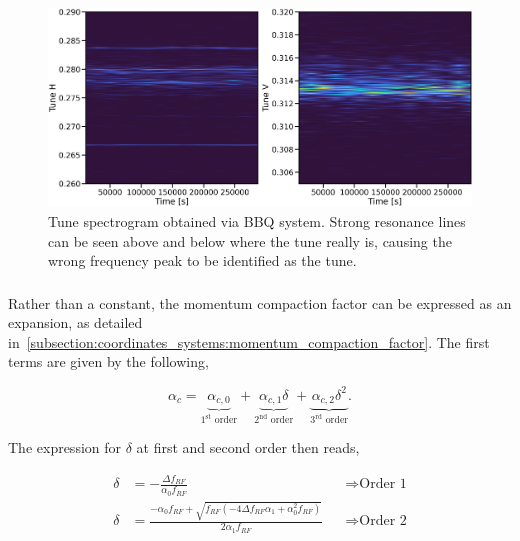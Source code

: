 \begin{figure}[H]
    \centering
    \includegraphics[width=.8\textwidth]{./images/spectrogram.png}
    \caption{Tune spectrogram obtained via BBQ system. Strong resonance lines can be seen above and
    below where the tune really is, causing the wrong frequency peak to be identified as the tune.}
    \label{fig:decapoles:chromaticity:spectrogram}
\end{figure}



\subsubsection{}
\label{subsubsection:momentum_compaction_factor_studies}

Rather than a constant, the momentum compaction factor can be expressed as an
expansion, as detailed in~\cref{subsection:coordinates_systems:momentum_compaction_factor}.
The first terms are given by the following,

\begin{equation}
    \alpha_c = 
    \underbrace{\alpha_{c,0}}_{1^\text{st} \text{ order}}
    + \underbrace{\alpha_{c,1} \delta}_{2^\text{nd} \text{ order}}
    + \underbrace{\alpha_{c,2} \delta^2}_{3^\text{rd} \text{ order}}.
\end{equation}

The expression for $\delta$ at first and second order then reads,

\begin{equation}
    \begin{aligned}
        \delta &= -\frac{\Delta f_{RF}}{\alpha_{0} f_{RF}} && \Rightarrow \text{Order 1} \\
        \delta &= \frac{- \alpha_{0} f_{RF} + \sqrt{f_{RF} 
            \left(- 4 \Delta f_{RF} \alpha_{1} + \alpha_{0}^{2} f_{RF}\right)}}{2 \alpha_{1} f_{RF}}
            && \Rightarrow \text{Order 2} 
    \end{aligned}
\end{equation}


